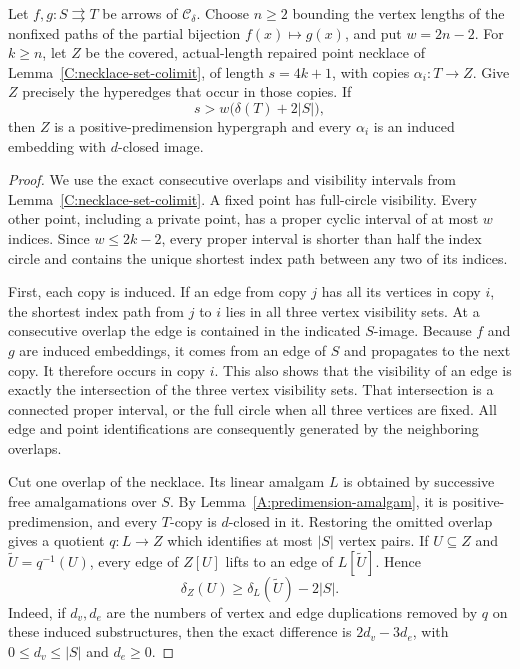 \begin{lemma}
\label{A:predimension-necklace}
Let $f,g:S\rightrightarrows T$ be arrows of $\mathcal C_\delta$.
Choose $n\geq2$ bounding the vertex lengths of the nonfixed paths
of the partial bijection $f(x)\mapsto g(x)$, and put $w=2n-2$.
For $k\geq n$, let $Z$ be the covered, actual-length repaired point
necklace of Lemma~\ref{C:necklace-set-colimit}, of length $s=4k+1$,
with copies $\alpha_i:T\to Z$. Give $Z$ precisely the hyperedges
that occur in those copies. If
\[
 s>w\bigl(\delta(T)+2|S|\bigr),
 \tag{PD}\label{eq:predimension-necklace-bound}
\]
then $Z$ is a positive-predimension hypergraph and every
$\alpha_i$ is an induced embedding with $d$-closed image.
\end{lemma}
\begin{proof}
We use the exact consecutive overlaps and visibility intervals from
Lemma~\ref{C:necklace-set-colimit}. A fixed point has full-circle
visibility. Every other point, including a private point, has a proper
cyclic interval of at most $w$ indices. Since $w\leq2k-2$, every
proper interval is shorter than half the index circle and contains
the unique shortest index path between any two of its indices.

First, each copy is induced. If an edge from copy $j$ has all its
vertices in copy $i$, the shortest index path from $j$ to $i$ lies
in all three vertex visibility sets. At a consecutive overlap the
edge is contained in the indicated $S$-image. Because $f$ and $g$
are induced embeddings, it comes from an edge of $S$ and propagates
to the next copy. It therefore occurs in copy $i$. This also shows
that the visibility of an edge is exactly the intersection of the
three vertex visibility sets. That intersection is a connected proper
interval, or the full circle when all three vertices are fixed.
All edge and point identifications are consequently generated by
the neighboring overlaps.

Cut one overlap of the necklace. Its linear amalgam $L$ is obtained
by successive free amalgamations over $S$. By
Lemma~\ref{A:predimension-amalgam}, it is positive-predimension,
and every $T$-copy is $d$-closed in it. Restoring the omitted overlap
gives a quotient $q:L\to Z$ which identifies at most $|S|$ vertex
pairs. If $U\subseteq Z$ and $\widetilde U=q^{-1}(U)$, every edge
of $Z[U]$ lifts to an edge of $L[\widetilde U]$. Hence
\[
 \delta_Z(U)\geq\delta_L(\widetilde U)-2|S|.
 \tag{1}\label{eq:predimension-cut-loss}
\]
Indeed, if $d_v,d_e$ are the numbers of vertex and edge duplications
removed by $q$ on these induced substructures, then the exact
difference is $2d_v-3d_e$, with $0\leq d_v\leq|S|$ and $d_e\geq0$.


\end{proof}

